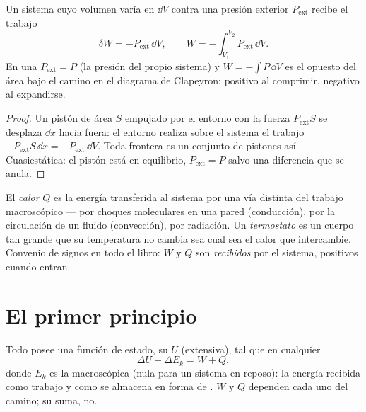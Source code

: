\begin{proposition}\label{prop:b1:first-law:work}
Un sistema cuyo volumen varía en $\dd V$ contra una presión exterior
$P_{\mathrm{ext}}$ recibe el trabajo
\[
\delta W = -P_{\mathrm{ext}}\,\dd V, \qquad
W = -\int_{V_1}^{V_2}P_{\mathrm{ext}}\,\dd V .
\]
En una  $P_{\mathrm{ext}} = P$ (la presión del
propio sistema) y $W = -\int P\,\dd V$ es el opuesto del área bajo el
camino en el diagrama de Clapeyron: positivo al comprimir, negativo al
expandirse.
\end{proposition}

\begin{proof}
Un pistón de área $S$ empujado por el entorno con la fuerza
$P_{\mathrm{ext}}S$ se desplaza $\dd x$ hacia fuera: el entorno realiza sobre
el sistema el trabajo $-P_{\mathrm{ext}}S\,\dd x = -P_{\mathrm{ext}}\,\dd V$.
Toda frontera es un conjunto de pistones así. Cuasiestática: el pistón
está en equilibrio, $P_{\mathrm{ext}} = P$ salvo una diferencia que se anula.
\end{proof}

\begin{definition}[Calor]\label{def:b1:first-law:heat}
El \emph{calor} $Q$ es la energía transferida al sistema por una vía
distinta del trabajo macroscópico --- por choques moleculares en una
pared (conducción), por la circulación de un fluido (convección), por
radiación. Un \emph{termostato} es un cuerpo tan grande que su
temperatura no cambia sea cual sea el calor que intercambie. Convenio de
signos en todo el libro: $W$ y $Q$ son \emph{recibidos} por el sistema,
positivos cuando entran.
\end{definition}

\section{El primer principio}

\begin{theorem}\label{thm:b1:first-law:firstlaw}
Todo  posee una función de estado, su \emph{}
$U$ (extensiva), tal que en cualquier 
\[
\Delta U + \Delta E_{k} = W + Q ,
\]
donde $E_k$ es la  macroscópica (nula para un sistema en
reposo): la energía recibida como trabajo y como  se almacena en
forma de . $W$ y $Q$ dependen cada uno del camino; su
suma, no.
\end{theorem}
\admitted

